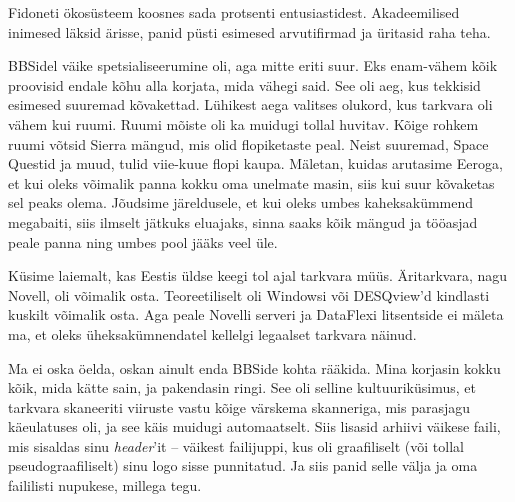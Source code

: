 
Fidoneti ökosüsteem koosnes sada 
protsenti entusiastidest. Akadeemilised inimesed läksid ärisse, panid püsti 
esimesed arvutifirmad ja üritasid raha teha. 


BBSidel väike spetsialiseerumine oli, aga mitte eriti suur. Eks 
enam-vähem kõik proovisid endale kõhu alla korjata, mida vähegi said. 
See oli aeg, kus tekkisid esimesed suuremad kõvakettad. 
Lühikest aega valitses olukord, kus tarkvara 
oli vähem kui ruumi. Ruumi mõiste oli ka muidugi tollal huvitav. Kõige 
rohkem ruumi võtsid Sierra mängud, mis olid flopiketaste peal. Neist suuremad, Space 
Questid ja muud, tulid viie-kuue flopi 
kaupa. Mäletan, kuidas arutasime Eeroga, et 
kui oleks võimalik panna kokku oma unelmate masin, siis kui suur kõvaketas sel 
peaks olema. Jõudsime järeldusele, et kui oleks umbes kaheksakümmend megabaiti, 
siis ilmselt jätkuks eluajaks, sinna saaks kõik mängud ja
tööasjad peale panna ning umbes pool jääks veel üle.


Küsime laiemalt, kas Eestis üldse keegi tol ajal tarkvara müüs. 
Äritarkvara, nagu Novell, oli võimalik osta. Teoreetiliselt oli 
Windowsi või DESQview'd kindlasti kuskilt võimalik osta. Aga peale Novelli serveri ja 
DataFlexi 
litsentside ei mäleta ma, et oleks üheksakümnendatel kellelgi 
legaalset tarkvara näinud. 


Ma ei oska öelda, oskan ainult enda BBSide kohta rääkida. Mina 
korjasin kokku kõik, mida kätte sain, ja pakendasin ringi. See 
oli selline kultuuriküsimus, et tarkvara skaneeriti viiruste vastu 
kõige värskema skanneriga, mis parasjagu käeulatuses oli, ja see käis 
muidugi automaatselt. Siis lisasid arhiivi väikese faili, 
mis sisaldas sinu \emph{header}'it – väikest 
failijuppi, kus oli graafiliselt (või tollal pseudograafiliselt) sinu 
logo sisse punnitatud. Ja siis panid selle välja ja oma faililisti nupukese, 
millega tegu. 

